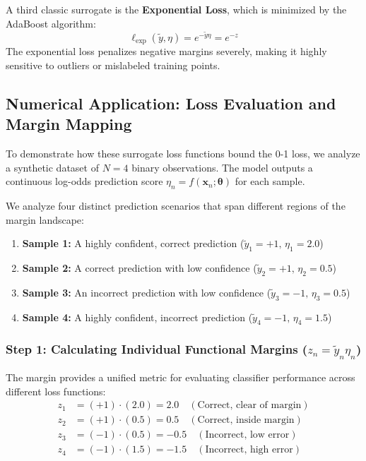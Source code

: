 \documentclass{article}
\begin{document}
A third classic surrogate is the \textbf{Exponential Loss}, which is minimized by the AdaBoost algorithm:
\begin{equation}
\ell_{\text{exp}}(\tilde{y}, \eta) = e^{-\tilde{y}\eta} = e^{-z}
\end{equation}
The exponential loss penalizes negative margins severely, making it highly sensitive to outliers or mislabeled training points.

\subsection{Numerical Application: Loss Evaluation and Margin Mapping}

To demonstrate how these surrogate loss functions bound the 0-1 loss, we analyze a synthetic dataset of $N = 4$ binary observations. The model outputs a continuous log-odds prediction score $\eta_n = f(\mathbf{x}_n; \boldsymbol{\theta})$ for each sample. 

We analyze four distinct prediction scenarios that span different regions of the margin landscape:
\begin{enumerate}
    \item \textbf{Sample 1:} A highly confident, correct prediction ($\tilde{y}_1 = +1, \, \eta_1 = 2.0$)
    \item \textbf{Sample 2:} A correct prediction with low confidence ($\tilde{y}_2 = +1, \, \eta_2 = 0.5$)
    \item \textbf{Sample 3:} An incorrect prediction with low confidence ($\tilde{y}_3 = -1, \, \eta_3 = 0.5$)
    \item \textbf{Sample 4:} A highly confident, incorrect prediction ($\tilde{y}_4 = -1, \, \eta_4 = 1.5$)
\end{enumerate}

\subsubsection{Step 1: Calculating Individual Functional Margins ($z_n = \tilde{y}_n \eta_n$)}
The margin provides a unified metric for evaluating classifier performance across different loss functions:
\begin{align}
z_1 &= (+1) \cdot (2.0) = \mathbf{2.0} \quad (\text{Correct, clear of margin}) \\
z_2 &= (+1) \cdot (0.5) = \mathbf{0.5} \quad (\text{Correct, inside margin}) \\
z_3 &= (-1) \cdot (0.5) = \mathbf{-0.5} \quad (\text{Incorrect, low error}) \\
z_4 &= (-1) \cdot (1.5) = \mathbf{-1.5} \quad (\text{Incorrect, high error})
\end{align}
\end{document}
